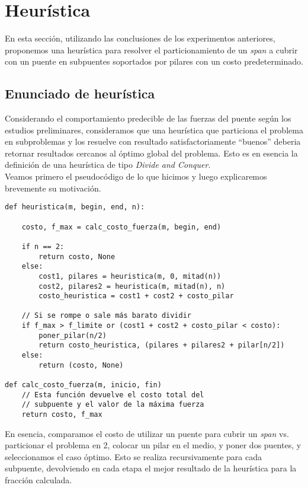 \section{Heurística}

En esta sección, utilizando las conclusiones de los experimentos anteriores, proponemos una heurística para resolver el particionamiento de un \textit{span} a cubrir con un puente en subpuentes soportados por pilares con un costo predeterminado.\\

\subsection{Enunciado de heurística}

Considerando el comportamiento predecible de las fuerzas del puente según los estudios preliminares, consideramos que una heurística que particiona el problema en subproblemas y los resuelve con resultado satisfactoriamente ``buenos'' deberia retornar resultados cercanos al óptimo global del problema. Esto es en esencia la definición de una heurística de tipo \textit{Divide and Conquer}.\\

Veamos primero el pseudocódigo de lo que hicimos y luego explicaremos brevemente su motivación.\\

\begin{verbatim}
def heuristica(m, begin, end, n):

    costo, f_max = calc_costo_fuerza(m, begin, end)

    if n == 2:
        return costo, None
    else:
        cost1, pilares = heuristica(m, 0, mitad(n))
        cost2, pilares2 = heuristica(m, mitad(n), n)
        costo_heuristica = cost1 + cost2 + costo_pilar

    // Si se rompe o sale más barato dividir
    if f_max > f_limite or (cost1 + cost2 + costo_pilar < costo):
        poner_pilar(n/2)
        return costo_heuristica, (pilares + pilares2 + pilar[n/2])
    else:
        return (costo, None)
                        
def calc_costo_fuerza(m, inicio, fin)
    // Esta función devuelve el costo total del
    // subpuente y el valor de la máxima fuerza
    return costo, f_max
\end{verbatim}

En esencia, comparamos el costo de utilizar un puente para cubrir un \textit{span} vs. particionar el problema en 2, colocar un pilar en el medio, y poner dos puentes, y seleccionamos el caso óptimo. Esto se realiza recursivamente para cada subpuente, devolviendo  en cada etapa el mejor resultado de la heurística para la fracción calculada.

